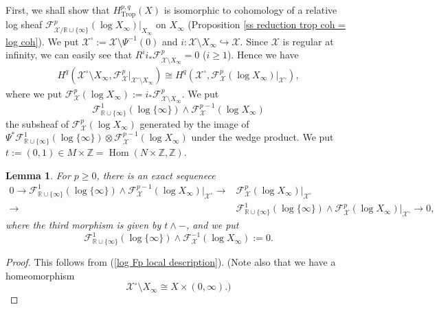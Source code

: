\documentclass[12pt,a4]{amsart}
\newtheorem{lem}[thm]{Lemma}
\def\R{\mathbb{R}}
\def\Z{\mathbb{Z}}
\def\F{\mathscr{F}}
\def\X{\mathscr{X}}
\def\Trop{\mathop{\mathrm{trop}}\nolimits}
\def\Hom{\mathop{\mathrm{Hom}}\nolimits}
\def\Trop{\mathop{\mathrm{Trop}}\nolimits}
\numberwithin{equation}{section}
\numberwithin{figure}{section}
\begin{document}
   First, we shall show that $H_{\Trop}^{p,q} (X)$ is isomorphic to cohomology of a relative log sheaf $\F^p_{\X / \R \cup \{ \infty  \} } (\log X_{\infty} )|_{ X_{\infty}  }$ on $X_{\infty}$ (Proposition \ref{ss reduction trop coh = log coh}).
  We put $\X^{\circ} :=\X \setminus \Psi^{-1}( 0  )$ 
  and $i \colon \X \setminus X_{\infty} 
  \hookrightarrow \X$.
   Since $\X $ is regular at infinity, 
  we can easily see that 
  $R^i i_* \F^p_{\X  \setminus X_{\infty}} = 0$ ($i \geq 1$). 
  Hence we have 
  \begin{align}
   H^{q} ( \X^{\circ} \setminus X_{\infty} ,
    \F^p_\X |_{\X^{\circ} \setminus X_{\infty}}) 
   \cong H^{q} ( \X^{\circ}, 
   \F^p_{\X} (\log X_{\infty} ) |_{ \X^{\circ}}  ),
    \label{eq tro coh relative log1}
  \end{align}
  where we put $
   \F^p_{\X} (\log X_{\infty} ) := i_* \F^p_{\X \setminus X_{\infty}}  $.
  We put 
  $$ \F^1_{\R \cup \{ \infty  \}} (\log \{ \infty  \}) 
    \wedge \F^{p-1}_\X (\log X_{\infty})$$
  the subsheaf of $\F^p_\X (\log X_{\infty})$
  generated by the image of 
  $ \Psi^{*} \F^1_{\R \cup \{ \infty  \}} (\log \{ \infty  \}) 
    \otimes \F^{p-1}_\X (\log X_{\infty})$
    under the wedge product.
  We put $t := (0,1)\in M\times \Z =\Hom (N \times \Z,\Z)$.
  
  \begin{lem}\label{Fp log computation}
    For $p \geq 0$, there is an exact sequenece 
    \begin{align*}
    0 \to \F^1_{\R \cup \{ \infty  \}} (\log \{ \infty  \}) 
     \wedge \F^{p-1}_\X (\log X_{\infty}) |_{ \X^{\circ} }
       \to &  \F^p_\X (\log X_{\infty}) |_{ \X^{\circ} } \\
       \to & \F^1_{\R \cup \{ \infty  \}} (\log \{ \infty  \}) 
     \wedge \F^{p}_\X (\log X_{\infty}) |_{ \X^{\circ} }
       \to 0 , 
    \end{align*}
    where the third morphism is given by $ t \wedge -$,
    and 
    we put 
    $$\F^1_{\R \cup \{ \infty  \}} (\log \{ \infty  \}) 
     \wedge \F^{-1}_\X (\log X_{\infty}) :=0 .$$
  \end{lem}
  \begin{proof}
  This follows from (\ref{log Fp local description}).
   (Note also that we have a homeomorphism
  $$\X^{\circ} \setminus X_{\infty}  \cong X \times (0,\infty).)$$
  \end{proof}
  
\end{document}
